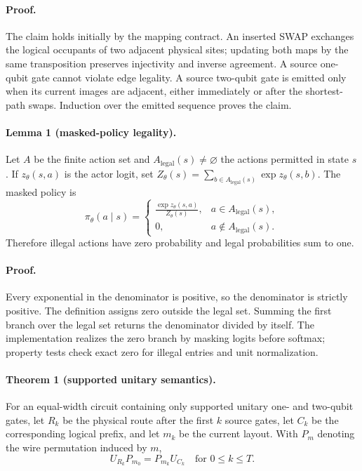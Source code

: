 \documentclass[conference]{IEEEtran}
\begin{document}
\paragraph{Proof.}
The claim holds initially by the mapping contract. An inserted SWAP exchanges
the logical occupants of two adjacent physical sites; updating both maps by
the same transposition preserves injectivity and inverse agreement. A source
one-qubit gate cannot violate edge legality. A source two-qubit gate is emitted
only when its current images are adjacent, either immediately or after the
shortest-path swaps. Induction over the emitted sequence proves the claim.

\paragraph{Lemma 1 (masked-policy legality).}
Let $A$ be the finite action set and $A_{\mathrm{legal}}(s)\neq\varnothing$
the actions permitted in state $s$. If $z_\theta(s,a)$ is the actor logit, set
$Z_\theta(s)=\sum_{b\in A_{\mathrm{legal}}(s)}\exp z_\theta(s,b)$. The masked
policy is
\begin{equation}
 \pi_\theta(a\mid s)=
 \begin{cases}
 \displaystyle\frac{\exp z_\theta(s,a)}{Z_\theta(s)},
 &a\in A_{\mathrm{legal}}(s),\\[5pt]
 0,&a\notin A_{\mathrm{legal}}(s).
 \end{cases}
 \label{eq:masked-policy}
\end{equation}
Therefore illegal actions have zero probability and legal probabilities sum
to one.

\paragraph{Proof.}
Every exponential in the denominator is positive, so the denominator is
strictly positive. The definition assigns zero outside the legal set. Summing
the first branch over the legal set returns the denominator divided by itself.
The implementation realizes the zero branch by masking logits before softmax;
property tests check exact zero for illegal entries and unit normalization.

\paragraph{Theorem 1 (supported unitary semantics).}
For an equal-width circuit containing only supported unitary one- and
two-qubit gates, let $R_k$ be the physical route after the first $k$
source gates, let $C_k$ be the corresponding logical prefix, and let $m_k$
be the current layout. With $P_m$ denoting the wire
permutation induced by $m$,
{\large
\begin{equation}
 U_{R_k}P_{m_0}=P_{m_k}U_{C_k}
 \quad\text{for }0\leq k\leq T .
 \label{eq:route-invariant}
\end{equation}
}
\end{document}
